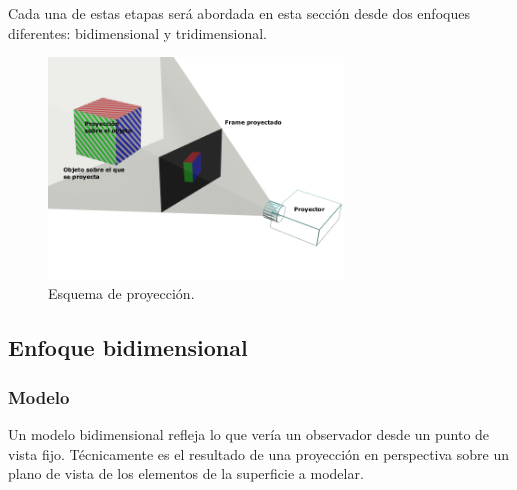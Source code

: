 Cada una de estas etapas será abordada en esta sección desde dos enfoques diferentes: bidimensional y tridimensional.
% 
% 
%


\begin{figure}[H]
  \centering
    \includegraphics[width=0.7\textwidth]{./Cap2_videomapping/proy2dvs3d}
  \caption[Imagen propia]{Esquema de proyección.}
  \label{fig:proy2dvs3d}
\end{figure}

\subsection{Enfoque bidimensional}
\subsubsection{Modelo}
Un modelo bidimensional refleja lo que vería un observador desde un punto de vista fijo.
Técnicamente es el resultado de una proyección en perspectiva \cite{LibroCompGrafica} sobre un plano de vista de los elementos de la superficie a modelar.

